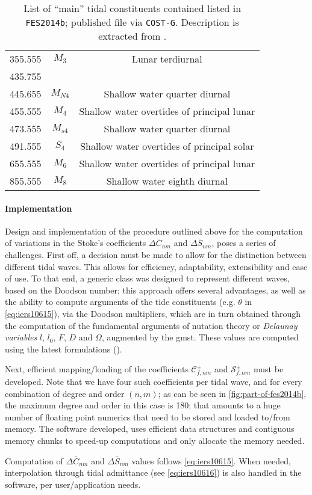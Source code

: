 \begin{table}[]
\begin{tabular}{ccc}
      355.555 & $M_3$ & Lunar terdiurnal \\
      435.755 & & \\
      445.655 & $M_{N4}$ & Shallow water quarter diurnal \\
      455.555 & $M_4$ & Shallow water overtides of principal lunar \\
      473.555 & $M_{s4}$ & Shallow water quarter diurnal \\
      491.555 & $S_4$ & Shallow water overtides of principal solar \\
      655.555 & $M_6$ & Shallow water overtides of principal lunar \\
      855.555 & $M_8$ & Shallow water eighth diurnal\\
      \hline
  \end{tabular}
  \caption{List of ``main'' tidal constituents contained listed in \texttt{FES2014b}; published 
    file via \texttt{COST-G}. Description is extracted from \cite{Beauducel2023}.}
  \label{table:tidal-constituents-fes14b}
\end{table}

\paragraph{Implementation}\label{par:ocean-tide-acceleration-implementation}
Design and implementation of the procedure outlined above for the computation of 
variations in the Stoke's coefficients $\Delta \bar{C}_{nm}$ and $\Delta \bar{S}_{nm}$, 
poses a series of challenges. First off, a decision must be made to allow for the 
distinction between different tidal waves. This allows for efficiency, adaptability, 
extensibility and ease of use. To that end, a generic class was designed to represent 
different waves, based on the Doodson number; this approach offers several advantages, 
as well as the ability to compute arguments of the tide constituents (e.g. $\theta$ 
in \autoref{eq:iers10615}), via the Doodson multipliers, which are in turn obtained 
through the computation of the fundamental arguments of nutation theory or 
\emph{Delaunay variables} $l$, $l_0$, $F$, $D$ and $\Omega$, augmented by the \gls{gmst}. 
These values are computed using the latest formulations (\cite{iers2010}).

Next, efficient mapping/loading of the coefficients $\mathcal{C}_{f,nm}^{\pm}$ and 
$\mathcal{S}_{f,nm}^{\pm}$ must be developed. Note that we have four such coefficients 
per tidal wave, and for every combination of degree and order $(n,m)$; as can be seen 
in \autoref{fig:part-of-fes2014b}, the maximum degree and order in this case is 180;
that amounts to a huge number of floating point numerics that need to be stored 
and loaded to/from memory. The software developed, uses efficient data structures and 
contiguous memory chunks to speed-up computations and only allocate the memory needed.

Computation of $\Delta \bar{C}_{nm}$ and $\Delta \bar{S}_{nm}$ values follows 
\autoref{eq:iers10615}. When needed, interpolation through tidal admittance (see 
\autoref{eq:iers10616}) is also handled in the software, per user/application needs. 
